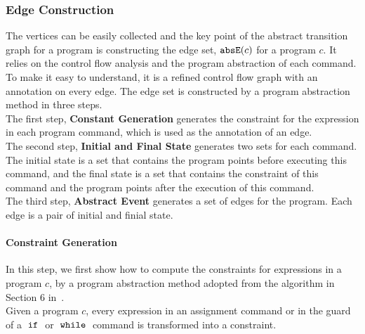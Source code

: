 \subsubsection{Edge Construction}
\label{sec:abscfg-edge}
  The vertices can be easily collected and the key point of the abstract
  transition graph for a program is constructing the edge set, $\mathtt{abs}{\mathtt{E}}(c)$ for a program $c$.
  It relies on the control flow analysis and the program abstraction of each command.
  To make it easy to understand, it
  is a refined control flow graph with an annotation on every edge.
  The edge set is constructed by a program abstraction method in three steps.
  \\
  The first step, \textbf{Constant Generation} generates the constraint
  for the expression in each program command,
  which is used as the annotation of an edge.
  \\
  The second step, \textbf{Initial and Final State} generates two sets for each command. 
  The initial state is a set that contains the
  program points before executing this command, and the final state is a set
  that contains the constraint of this command and the program points after the execution of this command.
  \\ 
  The third step, \textbf{Abstract Event} generates a set of edges for the program.
  Each edge is a pair of initial and finial state.
%
\paragraph{Constraint Generation}
In this step, we first show how to compute the constraints for expressions in a program $c$,
by a program abstraction method adopted from the
algorithm in Section 6 in~\cite{sinn2017complexity}.
\\
Given a program $c$,
every expression in an assignment command or in the guard of a $\;\mathtt{if}\;$ or $\;\mathtt{while}\;$ command
is transformed into a constraint.

